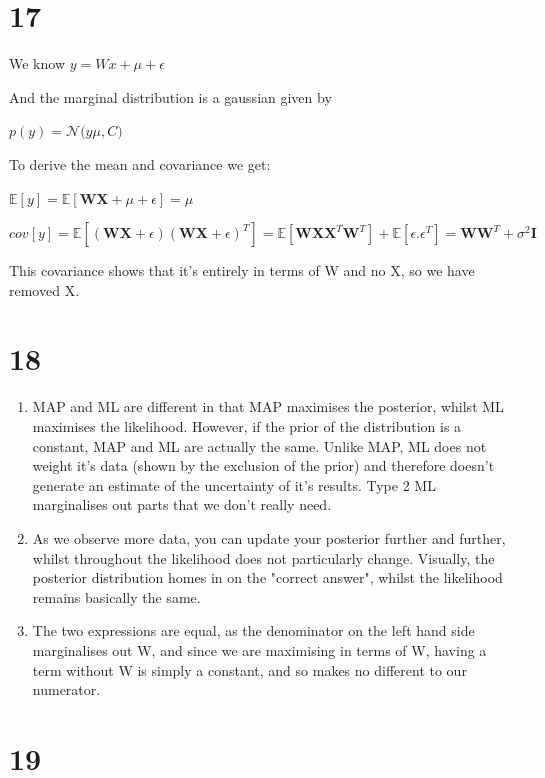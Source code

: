 \documentclass[11pt]{article}
\begin{document}
    \section*{17}\label{section}

We know \(y = Wx + \mu + \epsilon\)

And the marginal distribution is a gaussian given by

\(p(y) = \mathcal{N}(y\)\textbar{}\(\mu, C)\)

To derive the mean and covariance we get:

\(\mathbb E[y] = \mathbb E[\pmb W\pmb X + \mu + \epsilon] = \mu\)

\(cov[y] = \mathbb E[(\pmb W\pmb X + \epsilon)(\pmb W\pmb X + \epsilon)^T] = \mathbb E[\pmb W\pmb X\pmb X^T\pmb W^T] + \mathbb E[\epsilon.\epsilon^T] = \pmb W\pmb W^T + \sigma^2\pmb I\)

This covariance shows that it's entirely in terms of W and no X, so we
have removed X.

    \section*{18}\label{section}

\begin{enumerate}
\def\labelenumi{\alph{enumi})}
\item
  MAP and ML are different in that MAP maximises the posterior, whilst
  ML maximises the likelihood. However, if the prior of the distribution
  is a constant, MAP and ML are actually the same. Unlike MAP, ML does
  not weight it's data (shown by the exclusion of the prior) and
  therefore doesn't generate an estimate of the uncertainty of it's
  results. Type 2 ML marginalises out parts that we don't really need.
\item
  As we observe more data, you can update your posterior further and
  further, whilst throughout the likelihood does not particularly
  change. Visually, the posterior distribution homes in on the "correct
  answer", whilst the likelihood remains basically the same.
\item
  The two expressions are equal, as the denominator on the left hand
  side marginalises out W, and since we are maximising in terms of W,
  having a term without W is simply a constant, and so makes no
  different to our numerator.
\end{enumerate}

    \section*{19}\label{section}
\end{document}
